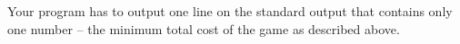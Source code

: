 Your program has to output one line on the standard output that contains only one number – the minimum total cost of the game as described above.